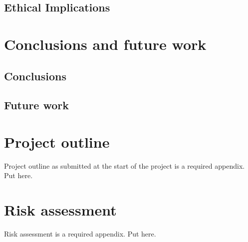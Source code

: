       \subsection{Ethical Implications}
  
  
  \section{Conclusions and future work} %
      \subsection{Conclusions}
      
      \subsection{Future work}
  
  
  \printbibliography[title={References},heading=bibintoc] %
  
  
  
  \begin{uomappendix} 
      \section{Project outline}
      Project outline as submitted at the start of the project is a required appendix. Put here. 
      
      \section{Risk assessment}
      Risk assessment is a required appendix. Put here.
      
  \end{uomappendix}
  
  
  